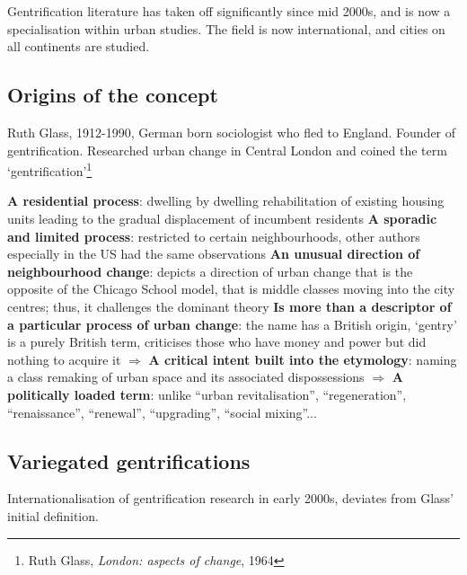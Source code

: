 \documentclass{article}
\begin{document}
Gentrification literature has taken off significantly since mid 2000s, and is now a specialisation within urban studies. The field is now international, and cities on all continents are studied.

\subsection{Origins of the concept}

Ruth Glass, 1912-1990, German born sociologist who fled to England. Founder of gentrification.
Researched urban change in Central London and coined the term `gentrification'\footnote{Ruth Glass, \textit{London: aspects of change}, 1964}

\begin{outline}
	\1 \textbf{A residential process}: dwelling by dwelling rehabilitation of existing housing units leading to the gradual displacement of incumbent residents
	\1 \textbf{A sporadic and limited process}: restricted to certain neighbourhoods, other authors especially in the US had the same observations
	\1 \textbf{An unusual direction of neighbourhood change}: depicts a direction of urban change that is the opposite of the Chicago School model, that is middle classes moving into the city centres; thus, it challenges the dominant theory
	\1 \textbf{Is more than a descriptor of a particular process of urban change}: the name has a British origin, `gentry' is a purely British term, criticises those who have money and power but did nothing to acquire it
	\1 $\Rightarrow$ \textbf{A critical intent built into the etymology}: naming a class remaking of urban space and its associated dispossessions
	\1 $\Rightarrow$ \textbf{A politically loaded term}: unlike ``urban revitalisation'', ``regeneration'', ``renaissance'', ``renewal'', ``upgrading'', ``social mixing''...
\end{outline}

\subsection{Variegated gentrifications}

Internationalisation of gentrification research in early 2000s, deviates from Glass' initial definition.
\end{document}
